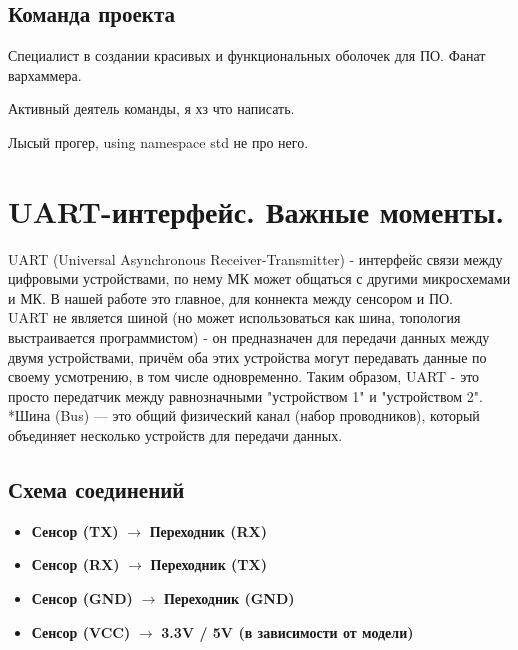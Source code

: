 \documentclass[12pt,a4paper]{article}
\begin{document}
\subsection{Команда проекта}
\begin{description}[style=nextline]
    \item[Андрей] Специалист в создании красивых и функциональных оболочек для ПО. Фанат вархаммера.
    \item[Милана] Активный деятель команды, я хз что написать.
    \item[Халид] Лысый прогер, using namespace std не про него.
\end{description}

\newpage

\section{UART-интерфейс. Важные моменты.}

UART (Universal Asynchronous Receiver-Transmitter) - интерфейс связи между цифровыми устройствами, по нему МК может общаться с другими микросхемами и МК. В нашей работе это главное, для коннекта между сенсором и ПО.\\
UART не является шиной (но может использоваться как шина, топология выстраивается программистом) - он предназначен для передачи данных между двумя устройствами, причём оба этих устройства могут передавать данные по своему усмотрению, в том числе одновременно. Таким образом, UART - это просто передатчик между равнозначными "устройством 1" и "устройством 2".\\
*Шина (Bus) — это общий физический канал (набор проводников), который объединяет несколько устройств для передачи данных.\\
\subsection{Схема соединений}
\begin{itemize}
    \item \textbf{Сенсор (TX)} $\rightarrow$ \textbf{Переходник (RX)}
    \item \textbf{Сенсор (RX)} $\rightarrow$ \textbf{Переходник (TX)}
    \item \textbf{Сенсор (GND)} $\rightarrow$ \textbf{Переходник (GND)}
    \item \textbf{Сенсор (VCC)} $\rightarrow$ \textbf{3.3V / 5V (в зависимости от модели)}
\end{itemize}
\end{document}
